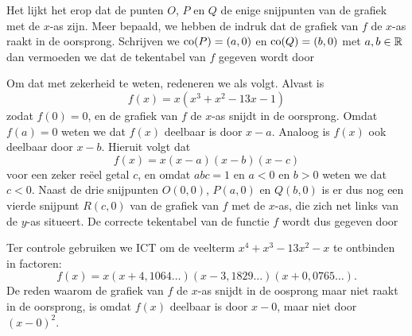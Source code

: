 \documentclass{ximera}
\begin{document}
\begin{example}
\begin{image}
\end{image}


Het lijkt het erop dat de punten $O$, $P$ en $Q$ de enige snijpunten van de grafiek met de $x$-as zijn. Meer bepaald, we hebben de indruk dat de grafiek van $f$ de $x$-as raakt in de oorsprong. Schrijven we $\operatorname{co}(P) = (a,0)$ en $\operatorname{co}(Q) = (b,0)$ met $a,b \in \mathbb{R}$ dan vermoeden we dat de tekentabel van $f$ gegeven wordt door
\renewcommand{\kolbreed}{\widthof{$a$}}


Om dat met zekerheid te weten, redeneren we als volgt. Alvast is 
\[
f(x) = x(x^3 + x^2 - 13x - 1)
\]
zodat $f(0) = 0$, en de grafiek van $f$ de $x$-as snijdt in de oorsprong.  Omdat $f(a) = 0$ weten we dat $f(x)$ deelbaar is door $x-a$. Analoog is $f(x)$ ook deelbaar door $x-b$. Hieruit volgt dat 
\[
f(x) = x(x-a)(x-b)(x-c)
\]
voor een zeker reëel getal $c$, en omdat $abc = 1$ en $a < 0$ en $b > 0$ weten we dat $c < 0$. Naast de drie snijpunten $O(0,0)$, $P(a,0)$ en $Q(b,0)$ is er dus nog een vierde snijpunt $R(c,0)$ van de grafiek van $f$ met de $x$-as, die zich net links van de $y$-as situeert. De correcte tekentabel van de functie $f$ wordt dus gegeven door
\renewcommand{\kolbreed}{\widthof{$a$}}


Ter controle gebruiken we ICT om de veelterm $x^4 + x^3 - 13x^2-x$ te ontbinden in factoren:
\[
f(x) = x(x+4,1064\ldots)(x-3,1829\ldots)(x+0,0765\ldots).
\]
De reden waarom de grafiek van $f$ de $x$-as snijdt in de oosprong maar niet raakt in de oorsprong, is omdat $f(x)$ deelbaar is door $x-0$, maar niet door $(x-0)^2$. 
\end{example} 

	
\end{document}
